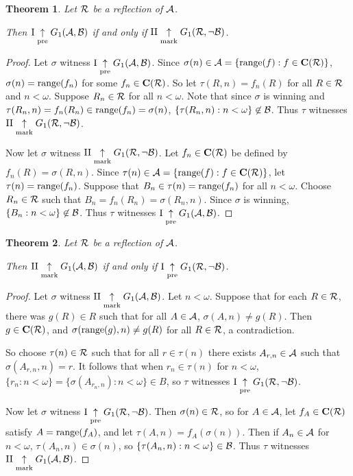 \documentclass{amsart}
\theoremstyle{plain}
\newtheorem{theorem}{Theorem}
\theoremstyle{definition}
\theoremstyle{remark}
\theoremstyle{plain}
\theoremstyle{definition}
\theoremstyle{remark}
\begin{document}
\begin{theorem}
  Let \(\mathcal{R}\) be a reflection of \(\mathcal{A}\). 

  Then
  \(\mathrm{I}\underset{\text{pre}}{\uparrow}G_{1}(\mathcal{A},\mathcal{B})\) if and only if
  \(\mathrm{II}\underset{\text{mark}}{\uparrow}G_{1}(\mathcal{R},\neg\mathcal{B})\).
\end{theorem}

\begin{proof}
  Let \(\sigma\) witness 
  \(\mathrm{I}\underset{\text{pre}}{\uparrow}G_{1}(\mathcal{A},\mathcal{B})\).
  Since \(\sigma(n)\in\mathcal{A}=\{\text{range}(f):f\in\mathbf C(\mathcal{R})\}\), 
  \(\sigma(n)=\text{range}(f_n)\)
  for some \(f_n\in\mathbf C(\mathcal{R})\). So let
  \(\tau(R,n)=f_n(R)\) for all \(R\in \mathcal{R}\) and \(n<\omega\).
  Suppose \(R_n\in \mathcal{R}\) for all \(n<\omega\).
  Note that since \(\sigma\) is winning and 
  \(\tau(R_n,n)=f_n(R_n)\in\text{range}(f_n)=\sigma(n)\),
  \(\{\tau(R_n,n):n<\omega\}\not\in\mathcal{B}\). Thus \(\tau\) witnesses
  \(\mathrm{II}\underset{\text{mark}}{\uparrow}G_{1}(\mathcal{R},\neg\mathcal{B})\).

  Now let \(\sigma\) witness
  \(\mathrm{II}\underset{\text{mark}}{\uparrow}G_{1}(\mathcal{R},\neg\mathcal{B})\).
  Let \(f_n\in\mathbf C(\mathcal{R})\) be defined by \(f_n(R)=\sigma(R,n)\).
  Since \(\tau(n)\in\mathcal{A}=\{\text{range}(f):f\in\mathbf C(\mathcal{R})\}\), let
  \(\tau(n)=\text{range}(f_n)\). Suppose that \(B_n\in\tau(n)=\text{range}(f_n)\) for
  all \(n<\omega\). Choose \(R_n\in\mathcal{R}\) such that 
  \(B_n=f_n(R_n)=\sigma(R_n,n)\). Since \(\sigma\) is winning,
  \(\{B_n:n<\omega\}\not\in\mathcal{B}\). Thus \(\tau\) witnesses
  \(\mathrm{I}\underset{\text{pre}}{\uparrow}G_{1}(\mathcal{A},\mathcal{B})\).
\end{proof}

\begin{theorem}
  Let \(\mathcal{R}\) be a reflection of \(\mathcal{A}\). 

  Then
  \(\mathrm{II}\underset{\text{mark}}{\uparrow}G_{1}(\mathcal{A},\mathcal{B})\) if and only if
  \(\mathrm{I}\underset{\text{pre}}{\uparrow}G_{1}(\mathcal{R},\neg\mathcal{B})\).
\end{theorem}

\begin{proof}
  Let \(\sigma\) witness 
  \(\mathrm{II}\underset{\text{mark}}{\uparrow}G_{1}(\mathcal{A},\mathcal{B})\).
  Let \(n<\omega\). Suppose that for each \(R\in\mathcal{R}\),
  there was \(g(R)\in R\) such that for all \(A\in \mathcal{A}\),
  \(\sigma(A,n)\not=g(R)\). Then \(g\in\mathbf C(\mathcal{R})\),
  and \(\sigma(\text{range}(g),n)\not=g(R)\) for all \(R\in\mathcal{R}\),
  a contradiction.

  So choose \(\tau(n)\in\mathcal{R}\) such that for all \(r\in \tau(n)\)
  there exists \(A_{r,n}\in\mathcal{A}\) such that \(\sigma(A_{r,n},n)=r\).
  It follows that when \(r_n\in\tau(n)\) for \(n<\omega\),
  \(\{r_n:n<\omega\}=\{\sigma(A_{r_n,n}):n<\omega\}\in B\),
  so \(\tau\) witnesses
  \(\mathrm{I}\underset{\text{pre}}{\uparrow}G_{1}(\mathcal{R},\neg\mathcal{B})\).

  Now let \(\sigma\) witness 
  \(\mathrm{I}\underset{\text{pre}}{\uparrow}G_{1}(\mathcal{R},\neg\mathcal{B})\).
  Then \(\sigma(n)\in\mathcal{R}\), so for \(A\in\mathcal{A}\), let
  \(f_A\in\mathbf C(\mathcal{R})\) satisfy \(A=\text{range}(f_A)\),
  and let \(\tau(A,n)=f_A(\sigma(n))\).
  Then if \(A_n\in\mathcal{A}\) for \(n<\omega\), \(\tau(A_n,n)\in\sigma(n)\),
  so \(\{\tau(A_n,n):n<\omega\}\in\mathcal{B}\).
  Thus \(\tau\) witnesses
  \(\mathrm{II}\underset{\text{mark}}{\uparrow}G_{1}(\mathcal{A},\mathcal{B})\).
\end{proof}
\end{document}
